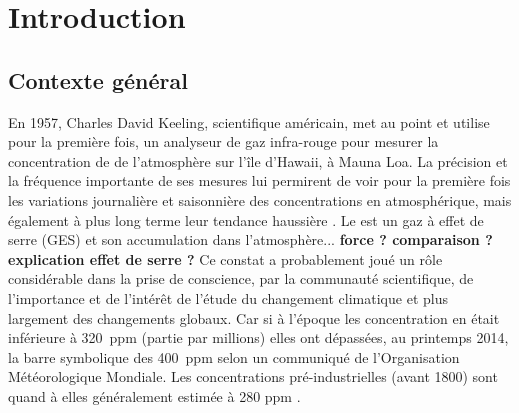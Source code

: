 
\chapter*{Introduction}
\newpage


\section*{Contexte général}


En 1957, Charles David Keeling, scientifique américain, met au point et utilise pour la première fois, un analyseur de gaz infra-rouge pour mesurer la concentration de \coo de l'atmosphère sur l'île d'Hawaii, à Mauna Loa.
La précision et la fréquence importante de ses mesures lui permirent de voir pour la première fois les variations journalière et saisonnière des concentrations en \coo atmosphérique, mais également à plus long terme leur tendance haussière \cite{harris2010}.
Le \coo est un gaz à effet de serre (GES) et son accumulation dans l'atmosphère... \textbf{force ? comparaison ? explication effet de serre ?}
Ce constat a probablement joué un rôle considérable dans la prise de conscience, par la communauté scientifique, de l'importance et de l'intérêt de l'étude du changement climatique et plus largement des changements globaux.
Car si à l'époque les concentration en \coo était inférieure à 320~ppm (partie par millions) elles ont dépassées, au printemps 2014, la barre symbolique des 400~ppm selon un communiqué de l'Organisation Météorologique Mondiale. Les concentrations pré-industrielles (avant 1800) sont quand à elles généralement estimée à 280 ppm \cite{Siegenthaler1987}.

